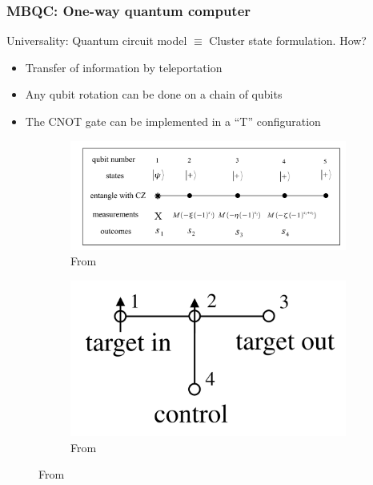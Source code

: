 \documentclass{beamer}
\theoremstyle{definition}
\begin{document}
\begin{frame}
\frametitle{MBQC: One-way quantum computer}

Universality: Quantum circuit model $\equiv$ Cluster state formulation. %
How? 

\begin{itemize}
	\item Transfer of information by teleportation
	\item Any qubit rotation can be done on a chain of qubits
	\item The CNOT gate can be implemented in a ``T'' configuration
\end{itemize}
\begin{figure}[!htb]
	\begin{subfigure}{.5\textwidth}
		\centering
		\includegraphics[scale=0.15]{rotate}
		\caption{From \cite{jozsa}}
	\end{subfigure}%
	\begin{subfigure}{.5\textwidth}
		\centering
		\includegraphics[scale=0.15]{CNOT}
		\caption{From \cite{MBQC}}
	\end{subfigure}
	
	
\end{figure}






\end{frame}
\end{document}
